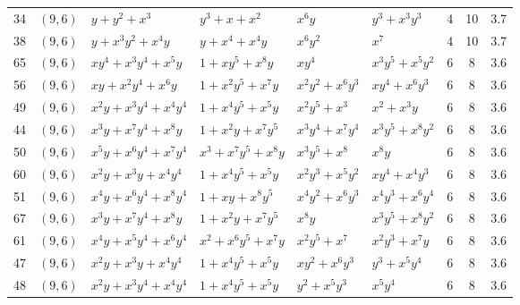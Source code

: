 \begin{table}[t]
\begin{tabular*}{\textwidth}{@{\extracolsep{\fill}}cllllllcc}
34 & $(9,6)$ & $y{+}y^{2}{+}x^{3}$ & $y^{3}{+}x{+}x^{2}$ & $x^{6}y$ & $y^{3}{+}x^{3}y^{3}$ & 4 & 10 & 3.7 \\
38 & $(9,6)$ & $y{+}x^{3}y^{2}{+}x^{4}y$ & $y{+}x^{4}{+}x^{4}y$ & $x^{6}y^{2}$ & $x^{7}$ & 4 & 10 & 3.7 \\
65 & $(9,6)$ & $xy^{4}{+}x^{3}y^{4}{+}x^{5}y$ & $1{+}xy^{5}{+}x^{8}y$ & $xy^{4}$ & $x^{3}y^{5}{+}x^{5}y^{2}$ & 6 & 8 & 3.6 \\
56 & $(9,6)$ & $xy{+}x^{2}y^{4}{+}x^{6}y$ & $1{+}x^{2}y^{5}{+}x^{7}y$ & $x^{2}y^{2}{+}x^{6}y^{3}$ & $xy^{4}{+}x^{6}y^{3}$ & 6 & 8 & 3.6 \\
49 & $(9,6)$ & $x^{2}y{+}x^{3}y^{4}{+}x^{4}y^{4}$ & $1{+}x^{4}y^{5}{+}x^{5}y$ & $x^{2}y^{5}{+}x^{3}$ & $x^{2}{+}x^{3}y$ & 6 & 8 & 3.6 \\
44 & $(9,6)$ & $x^{3}y{+}x^{7}y^{4}{+}x^{8}y$ & $1{+}x^{2}y{+}x^{7}y^{5}$ & $x^{3}y^{4}{+}x^{7}y^{4}$ & $x^{3}y^{5}{+}x^{8}y^{2}$ & 6 & 8 & 3.6 \\
50 & $(9,6)$ & $x^{5}y{+}x^{6}y^{4}{+}x^{7}y^{4}$ & $x^{3}{+}x^{7}y^{5}{+}x^{8}y$ & $x^{3}y^{5}{+}x^{8}$ & $x^{8}y$ & 6 & 8 & 3.6 \\
60 & $(9,6)$ & $x^{2}y{+}x^{3}y{+}x^{4}y^{4}$ & $1{+}x^{4}y^{5}{+}x^{5}y$ & $x^{2}y^{3}{+}x^{5}y^{2}$ & $xy^{4}{+}x^{4}y^{3}$ & 6 & 8 & 3.6 \\
51 & $(9,6)$ & $x^{4}y{+}x^{6}y^{4}{+}x^{8}y^{4}$ & $1{+}xy{+}x^{8}y^{5}$ & $x^{4}y^{2}{+}x^{6}y^{3}$ & $x^{4}y^{3}{+}x^{6}y^{4}$ & 6 & 8 & 3.6 \\
67 & $(9,6)$ & $x^{3}y{+}x^{7}y^{4}{+}x^{8}y$ & $1{+}x^{2}y{+}x^{7}y^{5}$ & $x^{8}y$ & $x^{3}y^{5}{+}x^{8}y^{2}$ & 6 & 8 & 3.6 \\
61 & $(9,6)$ & $x^{4}y{+}x^{5}y^{4}{+}x^{6}y^{4}$ & $x^{2}{+}x^{6}y^{5}{+}x^{7}y$ & $x^{2}y^{5}{+}x^{7}$ & $x^{2}y^{3}{+}x^{7}y$ & 6 & 8 & 3.6 \\
47 & $(9,6)$ & $x^{2}y{+}x^{3}y{+}x^{4}y^{4}$ & $1{+}x^{4}y^{5}{+}x^{5}y$ & $xy^{2}{+}x^{6}y^{3}$ & $y^{3}{+}x^{5}y^{4}$ & 6 & 8 & 3.6 \\
48 & $(9,6)$ & $x^{2}y{+}x^{3}y^{4}{+}x^{4}y^{4}$ & $1{+}x^{4}y^{5}{+}x^{5}y$ & $y^{2}{+}x^{5}y^{3}$ & $x^{5}y^{4}$ & 6 & 8 & 3.6 \\
\bottomrule
\end{tabular*}
\end{table}

